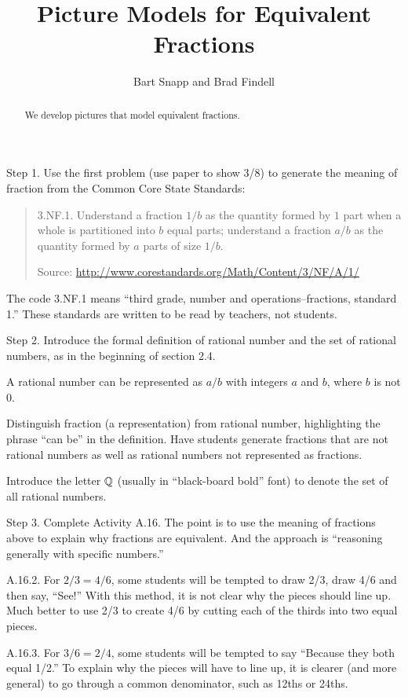 \documentclass[nooutcomes]{ximera}
\title{Picture Models for Equivalent Fractions}
\author{Bart Snapp and Brad Findell}
\begin{document}
\begin{abstract}
  We develop pictures that model equivalent fractions.
\end{abstract}
\maketitle

\label{A:EF}

\begin{teachingnote}
Step 1.  Use the first problem (use paper to show 3/8) to generate the meaning of fraction from the Common Core State Standards:  

\begin{quote}
3.NF.1. Understand a fraction $1/b$ as the quantity formed by $1$ part when a
whole is partitioned into $b$ equal parts; understand a fraction $a/b$ as
the quantity formed by $a$ parts of size $1/b$.

Source:  \url{http://www.corestandards.org/Math/Content/3/NF/A/1/}
\end{quote}

The code 3.NF.1 means ``third grade, number and operations--fractions, standard 1.''  These standards are written to be read by teachers, not students.

Step 2.  Introduce the formal definition of rational number and the set of rational numbers, as in the beginning of section 2.4.  

A rational number can be represented as $a/b$ with integers $a$ and $b$, where $b$ is not $0$.  

Distinguish fraction (a representation) from rational number, highlighting the phrase ``can be'' in the definition.  Have students generate fractions that are not rational numbers as well as rational numbers not represented as fractions.  

Introduce the letter $\mathbb Q$ (usually in ``black-board bold'' font) to denote the set of all rational numbers. 

Step 3.  Complete Activity A.16.  The point is to use the meaning of fractions above to explain why fractions are equivalent.  And the approach is ``reasoning generally with specific numbers.'' 

A.16.2.  For $2/3 = 4/6$, some students will be tempted to draw 2/3, draw 4/6 and then say, ``See!''  With this method, it is not clear why the pieces should line up.  Much better to use 2/3 to create 4/6 by cutting each of the thirds into two equal pieces.  

A.16.3.  For $3/6 = 2/4$, some students will be tempted to say ``Because they both equal 1/2.''  To explain why the pieces will have to line up, it is clearer (and more general) to go through a common denominator, such as 12ths or 24ths.  
 

\end{teachingnote}
\end{document}
